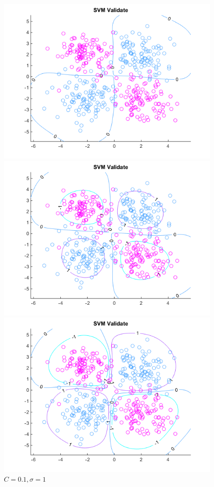 \documentclass[10pt,letterpaper]{article}
\begin{document}
\begin{center}
\begin{figure}[!htb]
  \includegraphics[width=\linewidth]{figures/C,01sigma1.png}
  \caption{$C = 0.01, \sigma = 1$}
\endminipage\hfill
{}
  \includegraphics[width=\linewidth]{figures/C,1sigma1.png}
  \caption{$C = 0.1, \sigma = 1$}
\endminipage\hfill
{}
  \includegraphics[width=\linewidth]{figures/C1sigma1.png}

\end{figure}
\end{center}
\end{document}

